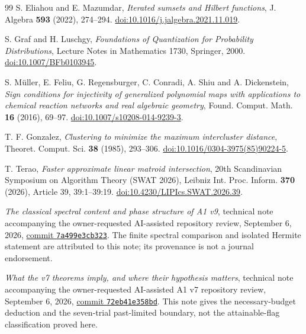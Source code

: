 \begin{thebibliography}{99}
S. Eliahou and E. Mazumdar, \emph{Iterated sumsets and Hilbert functions},
J. Algebra \textbf{593} (2022), 274--294.
\href{https://doi.org/10.1016/j.jalgebra.2021.11.019}{doi:10.1016/j.jalgebra.2021.11.019}.

S. Graf and H. Luschgy, \emph{Foundations of Quantization for Probability
Distributions}, Lecture Notes in Mathematics 1730, Springer, 2000.
\href{https://doi.org/10.1007/BFb0103945}{doi:10.1007/BFb0103945}.

S. M\"uller, E. Feliu, G. Regensburger, C. Conradi, A. Shiu and
A. Dickenstein, \emph{Sign conditions for injectivity of generalized
polynomial maps with applications to chemical reaction networks and
real algebraic geometry}, Found. Comput. Math. \textbf{16} (2016),
69--97.
\href{https://doi.org/10.1007/s10208-014-9239-3}{doi:10.1007/s10208-014-9239-3}.

T. F. Gonzalez, \emph{Clustering to minimize the maximum intercluster
distance}, Theoret. Comput. Sci. \textbf{38} (1985), 293--306.
\href{https://doi.org/10.1016/0304-3975(85)90224-5}{doi:10.1016/0304-3975(85)90224-5}.

T. Terao, \emph{Faster approximate linear matroid intersection},
20th Scandinavian Symposium on Algorithm Theory
(SWAT 2026), Leibniz Int. Proc. Inform. \textbf{370} (2026),
Article 39, 39:1--39:19.
\href{https://doi.org/10.4230/LIPIcs.SWAT.2026.39}{doi:10.4230/LIPIcs.SWAT.2026.39}.

\emph{The classical spectral content and phase structure of A1 v9},
technical note accompanying the owner-requested AI-assisted repository
review, September 6, 2026,
\href{https://github.com/TrillionniumFoundation/theta-theory/blob/7a499e3cb32396b18eda869342ec8e9c70d8d028/reviews/a1-english-v9-2026-09-06/TECHNICAL_NOTE.md}{commit \texttt{7a499e3cb323}}.
The finite spectral comparison and isolated Hermite statement are
attributed to this note; its provenance is not a journal endorsement.

\emph{What the v7 theorems imply, and where their hypothesis matters},
technical note accompanying the owner-requested AI-assisted A1 v7
repository review, September 6, 2026,
\href{https://github.com/TrillionniumFoundation/theta-theory/blob/72eb41e358bd9af122367fea66d0de9bdda07456/reviews/a1-english-v7-2026-09-06/TECHNICAL_NOTE.md}{commit \texttt{72eb41e358bd}}.
This note gives the necessary-budget deduction and the seven-trial
past-limited boundary, not the attainable-flag classification proved here.


\end{thebibliography}
